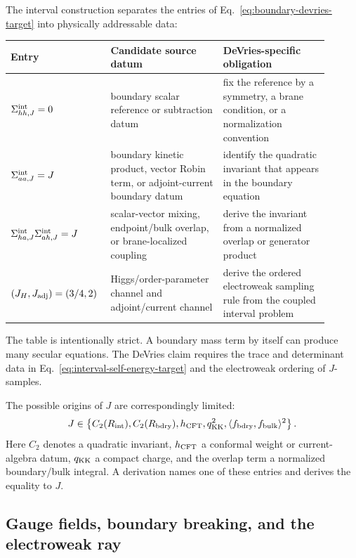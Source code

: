 The interval construction separates the entries of Eq.~\eqref{eq:boundary-devries-target} into physically addressable data:
\begin{center}
\begin{tabular}{p{0.24\linewidth}p{0.34\linewidth}p{0.32\linewidth}}
\toprule
Entry & Candidate source datum & DeVries-specific obligation \\
\midrule
\(\Sigma_{hh,J}^{\rm int}=0\) & boundary scalar reference or subtraction datum & fix the reference by a symmetry, a brane condition, or a normalization convention \\
\(\Sigma_{aa,J}^{\rm int}=J\) & boundary kinetic product, vector Robin term, or adjoint-current boundary datum & identify the quadratic invariant that appears in the boundary equation \\
\(\Sigma_{ha,J}^{\rm int}\Sigma_{ah,J}^{\rm int}=J\) & scalar-vector mixing, endpoint/bulk overlap, or brane-localized coupling & derive the invariant from a normalized overlap or generator product \\
\((J_H,J_{\rm adj})=(3/4,2)\) & Higgs/order-parameter channel and adjoint/current channel & derive the ordered electroweak sampling rule from the coupled interval problem \\
\bottomrule
\end{tabular}
\end{center}
The table is intentionally strict.  A boundary mass term by itself can produce many secular equations.  The DeVries claim requires the trace and determinant data in Eq.~\eqref{eq:interval-self-energy-target} and the electroweak ordering of \(J\)-samples.

The possible origins of \(J\) are correspondingly limited:
\begin{equation}
  J
  \in
  \left\{
  C_2(R_{\rm int}),
  C_2(R_{\rm bdry}),
  h_{\rm CFT},
  q_{\rm KK}^2,
  \langle f_{\rm bdry},f_{\rm bulk}\rangle^2
  \right\}.
  \label{eq:J-origin-list}
\end{equation}
Here \(C_2\) denotes a quadratic invariant, \(h_{\rm CFT}\) a conformal weight or current-algebra datum, \(q_{\rm KK}\) a compact charge, and the overlap term a normalized boundary/bulk integral.  A derivation names one of these entries and derives the equality to \(J\).

\subsection{Gauge fields, boundary breaking, and the electroweak ray}
\label{sec:kk-gauge-ray}

